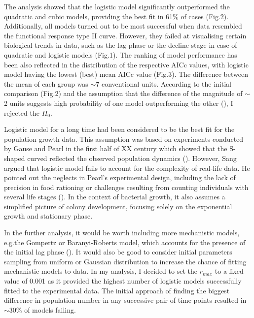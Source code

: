 \documentclass[a4paper,11pt]{article}
\begin{document}
The analysis showed that the logistic model significantly outperformed the quadratic and cubic models, providing the best fit in 61\% of cases (Fig.2). Additionally, all models turned out to be most successful when data resembled the functional response type II curve. However, they failed at visualising certain biological trends in data, such as the lag phase or the decline stage in case of quadratic and logistic models (Fig.1). The ranking of model performance has been also reflected in the distribution of the respective AICc values, with logistic model having the lowest (best) mean AICc value (Fig.3). The difference between the mean of each group was $\sim$7 conventional units. According to the initial comparison (Fig.2) and the assumption that the difference of the magnitude of $\sim$ 2 units suggests high probability of one model outperforming the other (\cite{motulsky2004fitting}), I rejected the $H_{0}$.\par

Logistic model for a long time had been considered to be the best fit for the population growth data. This assumption was based on experiments conducted by Gause and Pearl in the first half of XX century which showed that the S-shaped curved reflected the observed population dynamics (\cite{krebs1985ecology}). However, Sang argued that logistic model fails to account for the complexity of real-life data. He pointed out the neglects in Pearl's experimental design, including the lack of precision in food rationing or challenges resulting from counting individuals with several life stages (\cite{krebs1985ecology}). In the context of bacterial growth, it also assumes a simplified picture of colony development, focusing solely on the exponential growth and stationary phase.\par

In the further analysis, it would be worth including more mechanistic models, e.g.the Gompertz or Baranyi-Roberts model, which accounts for the presence of the initial lag phase (\cite{buchanan1997simple}). It would also be good to consider initial parameters sampling from uniform or Gaussian distribution to increase the chance of fitting mechanistic models to data. In my analysis, I decided to set the $r_{max}$ to a fixed value of 0.001 as it provided the highest number of logistic models successfully fitted to the experimental data. The initial approach of finding the biggest difference in population number in any successive pair of time points resulted in $\sim$30\% of models failing.\par
\end{document}
